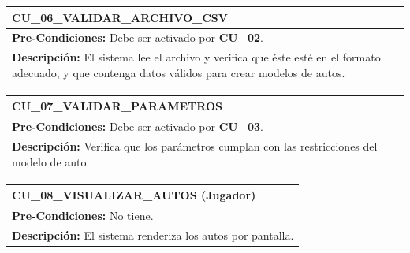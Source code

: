 \begin{center}
  \begin{tabular}{| p{7.5cm} | p{7.5cm} |}
    \hline
    \multicolumn{2}{|p{15cm}|}{\textbf{CU\_06\_VALIDAR\_ARCHIVO\_CSV}} \\ \hline
    \multicolumn{2}{|p{15cm}|}{\textbf{Pre-Condiciones:} Debe ser activado por \textbf{CU\_02}.} \\ \hline
    \multicolumn{2}{|p{15cm}|}{\textbf{Descripción:} El sistema lee el archivo y verifica que éste esté en el formato adecuado, y que contenga datos válidos para crear modelos de autos.} \\
    \hline
  \end{tabular}
  
  \label{table:usecase:6}
\end{center}

\begin{center}
  \begin{tabular}{| p{7.5cm} | p{7.5cm} |}
    \hline
    \multicolumn{2}{|p{15cm}|}{\textbf{CU\_07\_VALIDAR\_PARAMETROS}} \\ \hline
    \multicolumn{2}{|p{15cm}|}{\textbf{Pre-Condiciones:} Debe ser activado por \textbf{CU\_03}.} \\ \hline
    \multicolumn{2}{|p{15cm}|}{\textbf{Descripción:} Verifica que los parámetros cumplan con las restricciones del modelo de auto.} \\
    \hline
  \end{tabular}
  
  \label{table:usecase:7}
\end{center}

\begin{center}
  \begin{tabular}{| p{7.5cm} | p{7.5cm} |}
    \hline
    \multicolumn{2}{|p{15cm}|}{\textbf{CU\_08\_VISUALIZAR\_AUTOS} (Jugador)} \\ \hline
    \multicolumn{2}{|p{15cm}|}{\textbf{Pre-Condiciones:} No tiene.} \\ \hline
    \multicolumn{2}{|p{15cm}|}{\textbf{Descripción:} El sistema renderiza los autos por pantalla.} \\
    \hline
  \end{tabular}
  
  \label{table:usecase:8}
\end{center}

